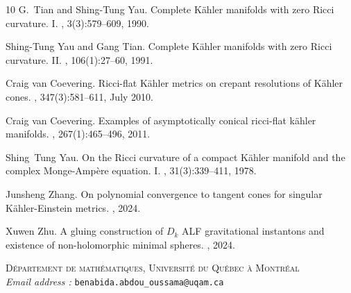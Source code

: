 \documentclass[a4paper,11pt]{article}
\begin{document}
\begin{thebibliography}{10}
G.~Tian and Shing-Tung Yau.
\newblock Complete {K}\"ahler manifolds with zero {R}icci curvature. {I}.
, 3(3):579--609, 1990.

Shing-Tung Yau and Gang Tian.
\newblock Complete {K\"ahler} manifolds with zero {Ricci} curvature. {II}.
, 106(1):27--60, 1991.

Craig van Coevering.
\newblock Ricci-flat {Kähler} metrics on crepant resolutions of {Kähler} cones.
, 347(3):581--611, July 2010.

Craig van Coevering.
\newblock Examples of asymptotically conical ricci-flat k{\"a}hler manifolds.
, 267(1):465--496, 2011.

Shing~Tung Yau.
\newblock On the {R}icci curvature of a compact {K}\"ahler manifold and the complex {M}onge-{A}mp\`ere equation. {I}.
, 31(3):339--411, 1978.

Junsheng Zhang.
\newblock On polynomial convergence to tangent cones for singular {K}{ä}hler-{E}instein metrics.
, 2024.

Xuwen Zhu.
\newblock A gluing construction of {$D_k$} {ALF} gravitational
  instantons and existence of non-holomorphic minimal spheres.
, 2024.


\end{thebibliography}
\medskip
\textsc{Département de mathématiques, Université du Québec à Montréal}\\
\textit{Email address :} \texttt{benabida.abdou_oussama@uqam.ca}
\end{document}
